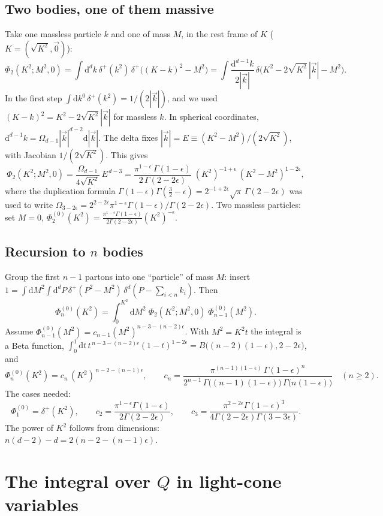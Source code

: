 \documentclass[11pt,a4paper]{article}
\newcommand{\ep}{\epsilon}
\newcommand{\dd}{\mathrm{d}}
\begin{document}
\subsection{Two bodies, one of them massive}
Take one massless particle $k$ and one of mass $M$, in the rest frame of $K$ ($K=(\sqrt{K^2},\vec 0)$):
\[
  \Phi_2(K^2;M^2,0)=\int\dd^dk\,\delta^+(k^2)\,\delta^+\big((K-k)^2-M^2\big)
  =\int\frac{\dd^{d-1}k}{2|\vec k|}\,\delta\big(K^2-2\sqrt{K^2}\,|\vec k|-M^2\big).
\]
In the first step $\int\dd k^0\,\delta^+(k^2)=1/(2|\vec k|)$, and we used $(K-k)^2=K^2-2\sqrt{K^2}|\vec k|$ for
massless $k$. In spherical coordinates, $\dd^{d-1}k=\Omega_{d-1}|\vec k|^{d-2}\dd|\vec k|$. The delta fixes
$|\vec k|=E\equiv(K^2-M^2)/(2\sqrt{K^2})$, with Jacobian $1/(2\sqrt{K^2})$. This gives
\[
  \Phi_2(K^2;M^2,0)=\frac{\Omega_{d-1}}{4\sqrt{K^2}}\,E^{\,d-3}
  =\frac{\pi^{1-\ep}\,\Gamma(1-\ep)}{2\,\Gamma(2-2\ep)}\;(K^2)^{-1+\ep}\,(K^2-M^2)^{1-2\ep},
\]
where the duplication formula $\Gamma(1-\ep)\Gamma(\frac32-\ep)=2^{-1+2\ep}\sqrt\pi\,\Gamma(2-2\ep)$ was used to
write $\Omega_{3-2\ep}=2^{2-2\ep}\pi^{1-\ep}\Gamma(1-\ep)/\Gamma(2-2\ep)$. Two massless particles: set $M=0$,
$\Phi^{(0)}_2(K^2)=\frac{\pi^{1-\ep}\Gamma(1-\ep)}{2\Gamma(2-2\ep)}(K^2)^{-\ep}$.

\subsection{\texorpdfstring{Recursion to $n$ bodies}{Recursion to n bodies}}
Group the first $n-1$ partons into one ``particle'' of mass $M$: insert
$1=\int\dd M^2\int\dd^dP\,\delta^+(P^2-M^2)\,\delta^d(P-\sum_{i<n}k_i)$. Then
\[
  \Phi^{(0)}_n(K^2)=\int_0^{K^2}\dd M^2\;\Phi_2(K^2;M^2,0)\;\Phi^{(0)}_{n-1}(M^2).
\]
Assume $\Phi^{(0)}_{n-1}(M^2)=c_{n-1}(M^2)^{n-3-(n-2)\ep}$. With $M^2=K^2t$ the integral is a Beta function,
$\int_0^1\dd t\,t^{\,n-3-(n-2)\ep}(1-t)^{1-2\ep}=B\big((n-2)(1-\ep),2-2\ep\big)$, and
\begin{equation}
  \Phi^{(0)}_n(K^2)=c_n\,(K^2)^{\,n-2-(n-1)\ep},\qquad
  c_n=\frac{\pi^{(n-1)(1-\ep)}\,\Gamma(1-\ep)^n}{2^{n-1}\,\Gamma\big((n-1)(1-\ep)\big)\,\Gamma\big(n(1-\ep)\big)}
  \quad(n\ge2).
  \label{eq:cn}
\end{equation}
The cases needed:
\[
  \Phi^{(0)}_1=\delta^+(K^2),\qquad
  c_2=\frac{\pi^{1-\ep}\Gamma(1-\ep)}{2\Gamma(2-2\ep)},\qquad
  c_3=\frac{\pi^{2-2\ep}\Gamma(1-\ep)^3}{4\Gamma(2-2\ep)\Gamma(3-3\ep)} .
\]
The power of $K^2$ follows from dimensions: $n(d-2)-d=2(n-2-(n-1)\ep)$.

\section{\texorpdfstring{The integral over $Q$ in light-cone variables}{The integral over Q in light-cone variables}}
\label{sec:lightcone}
\end{document}
